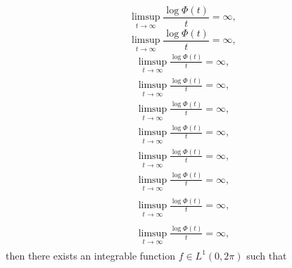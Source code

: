 \documentclass{amsart}
\numberwithin{equation}{section}
\begin{document}
{
\begin{equation*} \label{0-3}
\limsup_{t\to\infty}\frac{\log\Phi(t)}{t}=\infty,
 \end{equation*}\fi  
{}\begin{equation}\label{0-3}
\limsup_{t\to\infty}\frac{\log\Phi(t)}{t}=\infty,
\end{equation}\fi   
{}\begin{align*}\label{0-3}
\limsup_{t\to\infty}\frac{\log\Phi(t)}{t}=\infty,
\end{align*}\fi   
{}\begin{align}\label{0-3}
\limsup_{t\to\infty}\frac{\log\Phi(t)}{t}=\infty,
\end{align}\fi    
{}\begin{gather*}\label{0-3}
\limsup_{t\to\infty}\frac{\log\Phi(t)}{t}=\infty,
\end{gather*}\fi  
{}\begin{gather}\label{0-3}
\limsup_{t\to\infty}\frac{\log\Phi(t)}{t}=\infty,
\end{gather}\fi   
{}\begin{multline*}\label{0-3}
\limsup_{t\to\infty}\frac{\log\Phi(t)}{t}=\infty,
\end{multline*}\fi  
{}\begin{multline}\label{0-3}
\limsup_{t\to\infty}\frac{\log\Phi(t)}{t}=\infty,
\end{multline}\fi  
{}\begin{multline*}\begin{split}\label{0-3}
\limsup_{t\to\infty}\frac{\log\Phi(t)}{t}=\infty,
\end{split}\end{multline*}\fi
{}\begin{multline}\begin{split}\label{0-3}
\limsup_{t\to\infty}\frac{\log\Phi(t)}{t}=\infty,
\end{split}\end{multline}\fi
}
then there exists an integrable function $f\in L^1(0,2\pi)$ such that
\end{document}

